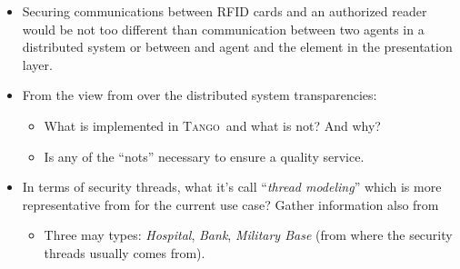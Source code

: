 \documentclass[10pt,a4paper,twoside]{llncs}
\newcommand{\tango}{\textsc{Tango}}
\begin{document}
\begin{itemize}
    \item Securing communications between RFID cards and an authorized reader \cite{Santi11} would be not too different than communication between two agents in a distributed system or between and agent and the element in the presentation layer.
    \item From the view from \cite{TanenbaumDistr} over the distributed system transparencies:
    \begin{itemize}
        \item What is implemented in \tango\, and what is not? And why?
        \item Is any of the ``nots'' necessary to ensure a quality service.
    \end{itemize}
    \begin{table}
    \end{table}
    \item In terms of security threads, what it's call ``\emph{thread modeling}'' which is more representative from \cite{SecEngRossAnderson} for the current use case? Gather information also from \cite{cryptoEngineering}
    \begin{itemize}
        \item Three may types: \emph{Hospital}, \emph{Bank}, \emph{Military Base} (from where the security threads usually comes from).

\end{itemize}
\end{itemize}
\end{document}
